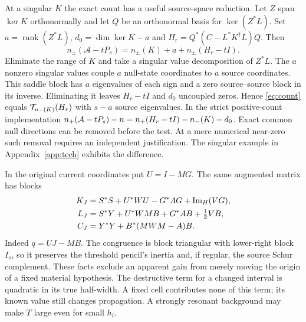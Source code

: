 At a singular $K$ the exact count has a useful source-space reduction. Let $Z$ span $\ker K$ orthonormally and let $Q$ be an orthonormal basis for $\ker(Z^*L)$. Set $a=\operatorname{rank}(Z^*L)$, $d_0=\dim\ker K-a$ and $H_r=Q^*(C-L^*K^\dagger L)Q$. Then
\[
 n_\pm(\mathcal A-tP_s)=n_\pm(K)+a+n_\pm(H_r-tI).
\]
Eliminate the range of $K$ and take a singular value decomposition of $Z^*L$. The $a$ nonzero singular values couple $a$ null-state coordinates to $a$ source coordinates. This saddle block has $a$ eigenvalues of each sign and a zero source--source block in its inverse. Eliminating it leaves $H_r-tI$ and $d_0$ uncoupled zeros. Hence \eqref{eq:count} equals $\mathcal T_{n_{-}(K)}(H_r)$ with $s-a$ source eigenvalues. In the strict positive-count implementation $n_{+}(\mathcal A-tP_s)-n=n_{+}(H_r-tI)-n_{-}(K)-d_0$. Exact common null directions can be removed before the test. At a mere numerical near-zero such removal requires an independent justification. The singular example in Appendix~\ref{app:tech} exhibits the difference.

In the original current coordinates put $U=I-MG$. The same augmented matrix has blocks
\begin{align}
 K_J&=S^*S+U^*WU-G^*AG+\operatorname{Im}_{H}(VG),\\
 L_J&=S^*Y+U^*WMB+G^*AB+\tfrac{{\rm i}}2VB,\\
 C_J&=Y^*Y+B^*(MWM-A)B. \label{eq:unshifted}
\end{align}
Indeed $q=UJ-MB$. The congruence is block triangular with lower-right block $I_s$, so it preserves the threshold pencil's inertia and, if regular, the source Schur complement. These facts exclude an apparent gain from merely moving the origin of a fixed material hypothesis. The destructive term for a changed interval is quadratic in its true half-width. A fixed cell contributes none of this term; its known value still changes propagation. A strongly resonant background may make $T$ large even for small $h_i$.

